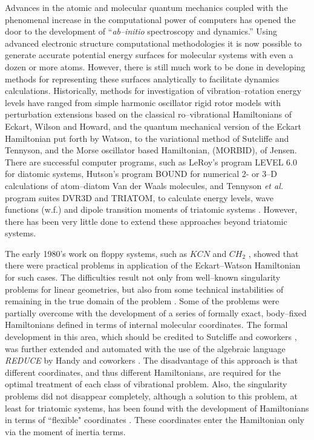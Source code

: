 Advances in 
the atomic and molecular quantum mechanics
coupled with the phenomenal
increase in the computational power of computers has opened the door to the
development of ``{\it ab--initio} spectroscopy and dynamics.'' Using
advanced electronic structure 
computational methodologies 
it is now possible to generate accurate potential energy
surfaces 
for molecular systems with even a dozen or more atoms. However,
there is still much work to be done in developing methods for representing
these surfaces analytically to facilitate dynamics calculations. 
Historically, methods
for investigation of vibration--rotation energy levels have ranged from
simple harmonic oscillator rigid rotor models with perturbation extensions
based on the classical ro--vibrational Hamiltonians of Eckart\cite{Eckart35},
Wilson and Howard\cite{WilsonHoward36}, and the quantum mechanical version
of the Eckart Hamiltonian put forth by Watson\cite{Watson68}, to the
variational method of Sutcliffe and Tennyson\cite{ref:ch22}, and
the Morse oscillator based Hamiltonian, (MORBID), of Jensen\cite{Jensen88}.
There are successful computer 
programs, such
as LeRoy's program LEVEL 6.0\cite{LeRoy95} for diatomic systems,
Hutson's program BOUND\cite{Hutson93} for numerical 2- or 3--D
calculations of atom--diatom Van 
der Waals molecules, and Tennyson {\it et al.}
program suites DVR3D and TRIATOM,
to calculate energy levels, wave functions (w.f.) and 
dipole transition moments of triatomic systems \cite{ref:ten1}.
However, there has been very little done to extend these
approaches beyond triatomic systems.

The early 1980's work on floppy systems, such as $KCN$ 
\cite{ref:kcn1,ref:kcn2,ref:kcn3} and $CH_2$
\cite{ref:ch21,ref:ch22,ref:ch23}, showed that there were
practical problems in application of the Eckart--Watson Hamiltonian
for such cases. The difficulties result not only from
well--known singularity problems for linear geometries, but
also from some technical instabilities 
of remaining in the true domain of the problem \cite{ref:j22}.
Some of the problems were partially overcome with the development of
a series of formally exact, body--fixed Hamiltonians defined
in terms of internal molecular coordinates. The formal development
in this area,
which should be credited to
Sutcliffe and coworkers
\cite{ref:j36}, was further extended and automated
with the use of the algebraic language {\em REDUCE} by Handy
and coworkers \cite{ref:j27}. The disadvantage of this approach
is that different coordinates, and thus different Hamiltonians,
are required for the optimal treatment of each class of
vibrational problem. Also, the singularity problems did not
disappear completely,
although a solution to 
this problem, at least for triatomic systems, has been found with the
development of Hamiltonians in terms of ``flexible" coordinates
\cite{ref:j32,ref:j33,ref:j34,ref:j35,ref:j36,ref:j37}.
These coordinates enter the Hamiltonian only via the moment of
inertia terms. 

